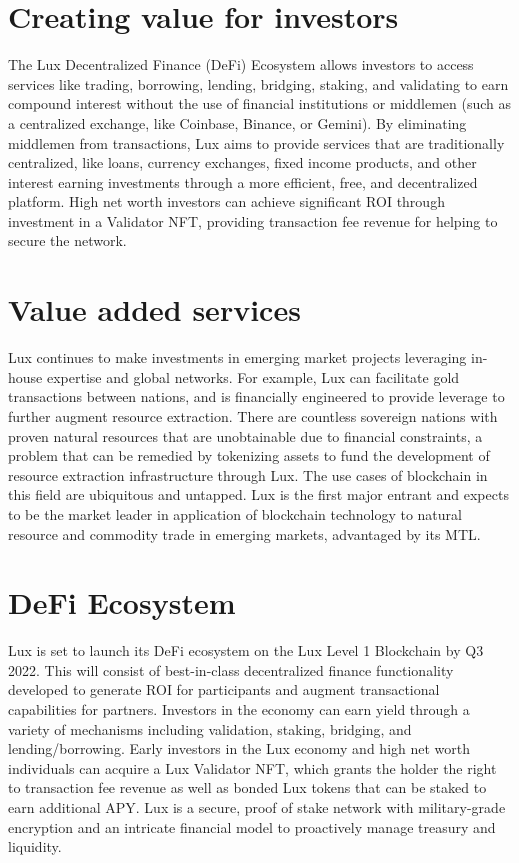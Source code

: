 \documentclass[11pt]{article}
\begin{document}
\section{Creating value for investors}

The Lux Decentralized Finance (DeFi) Ecosystem allows investors to access services like trading, borrowing, lending, bridging, staking, and validating to earn compound interest without the use of financial institutions or middlemen (such as a centralized exchange, like Coinbase, Binance, or Gemini). By eliminating middlemen from transactions, Lux aims to provide services that are traditionally centralized, like loans, currency exchanges, fixed income products, and other interest earning investments through a more efficient, free, and decentralized platform. High net worth investors can achieve significant ROI through investment in a Validator NFT, providing transaction fee revenue for helping to secure the network.


\section{Value added services}

Lux continues to make investments in emerging market projects leveraging in-house expertise and global networks. For example, Lux can facilitate gold transactions between nations, and is financially engineered to provide leverage to further augment resource extraction. There are countless sovereign nations with proven natural resources that are unobtainable due to financial constraints, a problem that can be remedied by tokenizing assets to fund the development of resource extraction infrastructure through Lux. The use cases of blockchain in this field are ubiquitous and untapped. Lux is the first major entrant and expects to be the market leader in application of blockchain technology to natural resource and commodity trade in emerging markets, advantaged by its MTL.


\section{DeFi Ecosystem}

Lux is set to launch its DeFi ecosystem on the Lux Level 1 Blockchain by Q3 2022. This will consist of best-in-class decentralized finance functionality developed to generate ROI for participants and augment transactional capabilities for partners. Investors in the economy can earn yield through a variety of mechanisms including validation, staking, bridging, and lending/borrowing. Early investors in the Lux economy and high net worth individuals can acquire a Lux Validator NFT, which grants the holder the right to transaction fee revenue as well as bonded Lux tokens that can be staked to earn additional APY. Lux is a secure, proof of stake network with military-grade encryption and an intricate financial model to proactively manage treasury and liquidity.
\end{document}
